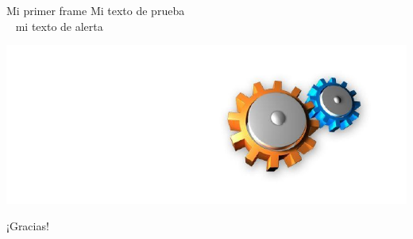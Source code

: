 \documentclass[11pt,xcolor={table}]{beamer}
\begin{document}
\begin{frame}{Mi primer frame}
\transdissolve
Mi texto de prueba
\\~
\alert{mi texto de alerta}

\includegraphics{proceso.pdf}
\end{frame}

\begin{frame}{¡Gracias!}
\transdissolve
\titlepage
\end{frame}
\end{document}
